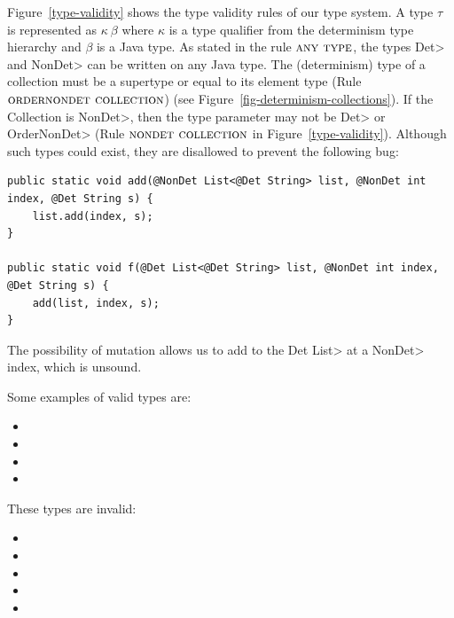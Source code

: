 Figure~\ref{type-validity} shows the type validity
rules of our type system. A type $\tau$ is represented as $\kappa \ \beta$
where $\kappa$ is a type qualifier from the determinism type hierarchy and $\beta$ is a Java type.
As stated in the rule $\textsc{any type}$, the types \<Det> and \<NonDet> can be written on any Java type.
The (determinism) type of a collection must be a supertype or equal to
its element type (Rule $\textsc{ordernondet collection}$) (see Figure~\ref{fig-determinism-collections}).
If the Collection is \<NonDet>, then the type parameter may not be
\<Det> or \<OrderNonDet> (Rule $\textsc{nondet collection}$ in Figure~\ref{type-validity}). Although such types could exist, they are
disallowed to prevent the following bug:

\begin{verbatim}
public static void add(@NonDet List<@Det String> list, @NonDet int index, @Det String s) {
    list.add(index, s);
}

public static void f(@Det List<@Det String> list, @NonDet int index, @Det String s) {
    add(list, index, s);
}
\end{verbatim}

The possibility of mutation allows us to add to the \<Det List> at a
\<NonDet> index, which is unsound.


Some examples of valid types are:
\begin{itemize}
    \item {}
    \item {}
    \item {}
    \item {}
\end{itemize}

These types are invalid:
\begin{itemize}
    \item {}
    \item {}
    \item {}
    \item {}
    \item {}
\end{itemize}

